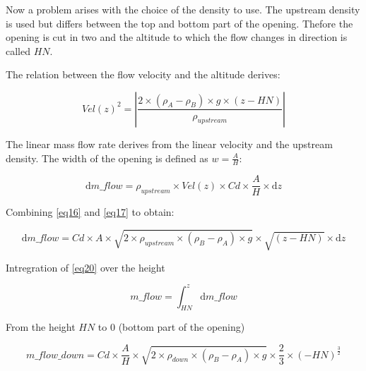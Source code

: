 \documentclass[a4paper, english]{article}
\begin{document}
            Now a problem arises with the choice of the density to use. The upstream density is used but differs between the top and bottom part of the opening. Thefore the opening is cut in two and the altitude to which the flow changes in direction is called $ HN $.
            
            The relation between the flow velocity and the altitude derives:
            
            \begin{equation}
                \label{eq16}
                Vel(z)^2 = \left | \frac{2 \times (\rho_A - \rho_B) \times g \times (z-HN)}{\rho_{upstream} } \right |
            \end{equation}
            
            The linear mass flow rate derives from the linear velocity and the upstream density. The width of the opening is defined as $ w = \frac{A}{H} $:
            
            \begin{equation}
                \label{eq17}
                \mathrm{d} m\_flow = \rho_{upstream} \times Vel(z) \times Cd \times \frac{A}{H} \times \mathrm{d} z
            \end{equation}
            
            Combining \eqref{eq16} and \eqref{eq17} to obtain:
            
            
            \begin{equation}
                \label{eq18}
                \mathrm{d} m\_flow = Cd \times A \times \sqrt{ 2 \times \rho_{upstream} \times ( \rho_B - \rho_A ) \times g } \times \sqrt{(z - HN)} \times \mathrm{d} z
            \end{equation}
            
            Intregration of \eqref{eq20} over the height
            
            \begin{equation}
                \label{eq19}
                m\_flow = \int_{HN}^{z} \mathrm{d} m\_flow
            \end{equation}
            
            From the height $ HN $ to  $ 0 $  (bottom part of the opening)
            
            \begin{equation} 
            \label{eq20}
                m\_flow\_down = Cd \times \frac{A}{H} \times \sqrt{ 2 \times \rho_{down} \times ( \rho_B - \rho_A ) \times g } \times \frac{2}{3} \times {(-HN)}^\frac{3}{2}
            \end{equation} 
            
\end{document}
